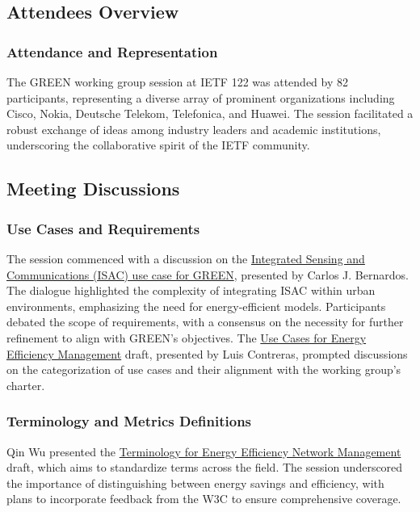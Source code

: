 \documentclass{article}
\begin{document}
\subsection{Attendees Overview}
\subsubsection{Attendance and Representation}
The GREEN working group session at IETF 122 was attended by 82 participants, representing a diverse array of prominent organizations including Cisco, Nokia, Deutsche Telekom, Telefonica, and Huawei. The session facilitated a robust exchange of ideas among industry leaders and academic institutions, underscoring the collaborative spirit of the IETF community.

\subsection{Meeting Discussions}
\subsubsection{Use Cases and Requirements}
The session commenced with a discussion on the \href{https://datatracker.ietf.org/doc/draft-bernardos-green-isac-uc/}{Integrated Sensing and Communications (ISAC) use case for GREEN}, presented by Carlos J. Bernardos. The dialogue highlighted the complexity of integrating ISAC within urban environments, emphasizing the need for energy-efficient models. Participants debated the scope of requirements, with a consensus on the necessity for further refinement to align with GREEN's objectives. The \href{https://datatracker.ietf.org/doc/draft-stephan-green-use-cases/}{Use Cases for Energy Efficiency Management} draft, presented by Luis Contreras, prompted discussions on the categorization of use cases and their alignment with the working group's charter.

\subsubsection{Terminology and Metrics Definitions}
Qin Wu presented the \href{https://datatracker.ietf.org/doc/draft-bclp-green-terminology/}{Terminology for Energy Efficiency Network Management} draft, which aims to standardize terms across the field. The session underscored the importance of distinguishing between energy savings and efficiency, with plans to incorporate feedback from the W3C to ensure comprehensive coverage.
\end{document}
